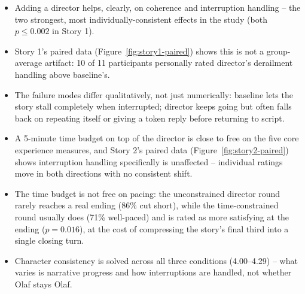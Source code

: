 \documentclass[10pt]{article}
\newcommand{\pval}[1]{$p = #1$}
\begin{document}
\begin{itemize}
\item Adding a director helps, clearly, on coherence and interruption handling -- the two strongest, most individually-consistent effects in the study (both $p \le 0.002$ in Story 1).
\item Story 1's paired data (Figure~\ref{fig:story1-paired}) shows this is not a group-average artifact: 10 of 11 participants personally rated director's derailment handling above baseline's.
\item The failure modes differ qualitatively, not just numerically: baseline lets the story stall completely when interrupted; director keeps going but often falls back on repeating itself or giving a token reply before returning to script.
\item A 5-minute time budget on top of the director is close to free on the five core experience measures, and Story 2's paired data (Figure~\ref{fig:story2-paired}) shows interruption handling specifically is unaffected -- individual ratings move in both directions with no consistent shift.
\item The time budget is not free on pacing: the unconstrained director round rarely reaches a real ending (86\% cut short), while the time-constrained round usually does (71\% well-paced) and is rated as more satisfying at the ending (\pval{0.016}), at the cost of compressing the story's final third into a single closing turn.
\item Character consistency is solved across all three conditions (4.00--4.29) -- what varies is narrative progress and how interruptions are handled, not whether Olaf stays Olaf.
\end{itemize}
\end{document}
